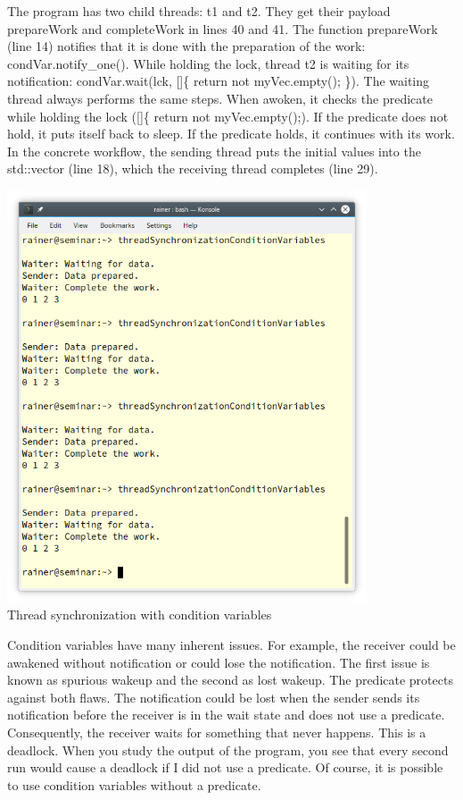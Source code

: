 The program has two child threads: t1 and t2. They get their payload prepareWork and completeWork in lines 40 and 41. The function prepareWork (line 14) notifies that it is done with the preparation of the work: condVar.notify\_one(). While holding the lock, thread t2 is waiting for its notification: condVar.wait(lck, []\{ return not myVec.empty(); \}). The waiting thread always performs the same steps. When awoken, it checks the predicate while holding the lock ([]\{ return not myVec.empty();). If the predicate does not hold, it puts itself back to sleep. If the predicate holds, it continues with its work. In the concrete workflow, the sending thread puts the initial values into the std::vector (line 18), which the receiving thread completes (line 29).

\begin{center}
\includegraphics[width=0.8\textwidth]{content/3/chapter6/images/12.png}\\
Thread synchronization with condition variables
\end{center}

Condition variables have many inherent issues. For example, the receiver could be awakened without notification or could lose the notification. The first issue is known as spurious wakeup and the second as lost wakeup. The predicate protects against both flaws. The notification could be lost when the sender sends its notification before the receiver is in the wait state and does not use a predicate. Consequently, the receiver waits for something that never happens. This is a deadlock. When you study the output of the program, you see that every second run would cause a deadlock if I did not use a predicate. Of course, it is possible to use condition variables without a predicate.


